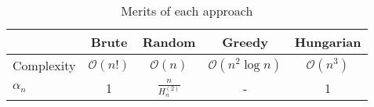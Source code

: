 \documentclass{article}
\newcommand{\boundedBy}[1]{\mathcal{O} \left ( #1 \right )}
\begin{document}
\begin{table}[H]
	\centering
	\begin{tabular}{l|c|c|c|c}
& Brute & Random & Greedy & Hungarian \\
\hline
Complexity & $\boundedBy{n!}$ & $\boundedBy{n}$ & $\boundedBy{n^2 \log n}$ & $\boundedBy{n^3}$ \\
$\alpha_n$ & 1 & $\frac{n}{H_n^{(2)}}$ & - & 1
	\end{tabular}
	\caption{Merits of each approach}
\end{table}



\end{document}
